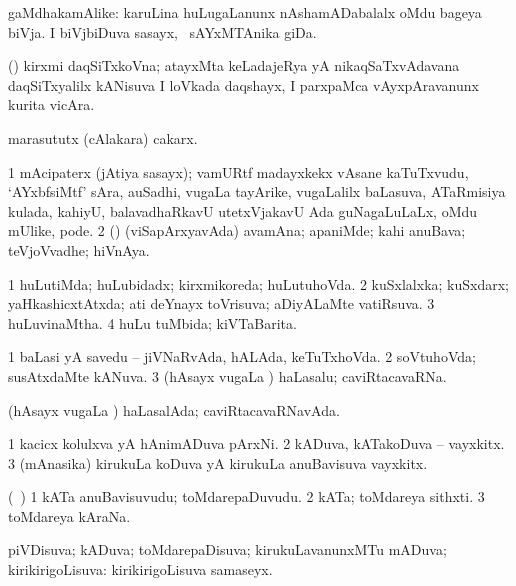 \begin{center}
\bentry
{} 
\gl{\nA}
\expl{}
\bmng
gaMdhakamAlike: 
\banum
{} karuLina huLugaLanunx nAshamADabalalx oMdu bageya biVja. 
 I biVjbiDuva sasayx, \kanmu\ sAYxMTAnika giDa. 
\eanum
\emng
\eentry

\bentry
{} 
\gl{\nA}
\expl{}
\bmng
(\hA) kirxmi daqSiTxkoVna; atayxMta keLadajeRya yA nikaqSaTxvAdavana daqSiTxyalilx kANisuva I loVkada daqshayx, I parxpaMca vAyxpAravanunx kurita vicAra. 
\emng
\eentry

\bentry
{} 
\gl{\nA}
\expl{}
\bmng
marasututx (cAlakara) cakarx. 
\emng
\eentry

\bentry
{} 
\gl{\nA}
\expl{}
\bmng
\bnum
\num{1} mAcipaterx (jAtiya sasayx); vamURtf madayxkekx vAsane kaTuTxvudu, `AYxbfsiMtf' sAra, auSadhi, \mo vugaLa tayArike, \mo vugaLalilx baLasuva, ATaRmisiya kulada, kahiyU, balavadhaRkavU utetxVjakavU Ada guNagaLuLaLx, oMdu mUlike, pode. 
\num{2} (\rUpa) (viSapArxyavAda) avamAna; apaniMde; kahi anuBava; teVjoVvadhe; hiVnAya. 
\enum
\emng
\eentry

\bentry
{} 
\gl{\gu}
\bmng
\bnum
\num{1} huLutiMda; huLubidadx; kirxmikoreda; huLutuhoVda. 
\num{2} kuSxlalxka; kuSxdarx; yaHkashicxtAtxda; ati deYnayx toVrisuva; aDiyALaMte vatiRsuva. 
\num{3} huLuvinaMtha. 
\num{4} huLu tuMbida; kiVTaBarita. 
\enum
\emng
\eentry

\bentry
{} 
\gl{\gu}
\expl{}
\bmng
\bnum
\num{1} baLasi yA savedu -- jiVNaRvAda, hALAda, keTuTxhoVda. 
\num{2} soVtuhoVda; susAtxdaMte kANuva. 
\num{3} (hAsayx \mo vugaLa \vi) haLasalu; caviRtacavaRNa. 
\enum
\emng

\noindent
\gl{\pagu}
\expl{}
\bmng
{} (hAsayx \mo vugaLa \vi) haLasalAda; caviRtacavaRNavAda. 
\emng
\eentry

\bentry
{} 
\gl{\nA}
\expl{}
\bmng
\bnum
\num{1} kacicx kolulxva yA hAnimADuva pArxNi. 
\num{2} kADuva, kATakoDuva -- vayxkitx. 
\num{3} (mAnasika) kirukuLa koDuva yA kirukuLa anuBavisuva vayxkitx. 
\enum
\emng
\eentry

\bentry
{} 
\gl{\nA}
\expl{}
\bmng
(\kanmu\ \ame) 
\bnum
\num{1} kATa anuBavisuvudu; toMdarepaDuvudu. 
\num{2} kATa; toMdareya sithxti. 
\num{3} toMdareya kAraNa. 
\enum
\emng
\eentry

\bentry
{} 
\gl{\gu}
\expl{}
\bmng
piVDisuva; kADuva; toMdarepaDisuva; kirukuLavanunxMTu mADuva; kirikirigoLisuva:  kirikirigoLisuva samaseyx. 
\emng
\eentry


\end{center}
